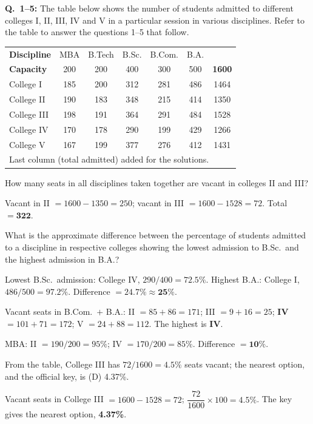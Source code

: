 \textbf{Q.~1--5:} The table below shows the number of students admitted to different colleges I, II, III, IV and V in a particular session in various disciplines. Refer to the table to answer the questions 1--5 that follow.
\begin{center}\small
\begin{tabular}{lccccc|c}\toprule \textbf{Discipline} & MBA & B.Tech & B.Sc. & B.Com. & B.A. & \\
\textbf{Capacity} & 200 & 200 & 400 & 300 & 500 & \textbf{1600}\\\midrule
College I & 185 & 200 & 312 & 281 & 486 & 1464\\ College II & 190 & 183 & 348 & 215 & 414 & 1350\\ College III & 198 & 191 & 364 & 291 & 484 & 1528\\ College IV & 170 & 178 & 290 & 199 & 429 & 1266\\ College V & 167 & 199 & 377 & 276 & 412 & 1431\\\bottomrule
\multicolumn{7}{l}{\scriptsize Last column (total admitted) added for the solutions.}
\end{tabular}
\end{center}

How many seats in all disciplines taken together are vacant in colleges II and III?

Vacant in II $=1600-1350=250$; vacant in III $=1600-1528=72$. Total $=\mathbf{322}$.

What is the approximate difference between the percentage of students admitted to a discipline in respective colleges showing the lowest admission to B.Sc.\ and the highest admission in B.A.?

Lowest B.Sc.\ admission: College IV, $290/400=72.5\%$. Highest B.A.: College I, $486/500=97.2\%$. Difference $=24.7\%\approx\mathbf{25\%}$.

Vacant seats in B.Com.\ $+$ B.A.: II $=85+86=171$; III $=9+16=25$; \textbf{IV $=101+71=172$}; V $=24+88=112$. The highest is \textbf{IV}.

MBA: II $=190/200=95\%$; IV $=170/200=85\%$. Difference $=\mathbf{10\%}$.

From the table, College III has $72/1600=4.5\%$ seats vacant; the nearest option, and the official key, is (D) 4.37\%.

Vacant seats in College III $=1600-1528=72$; $\dfrac{72}{1600}\times100=4.5\%$. The key gives the nearest option, \textbf{4.37\%}.

